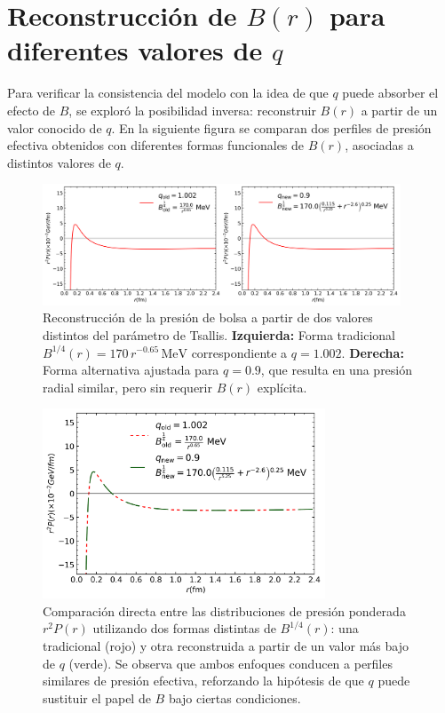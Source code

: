 \section{Reconstrucci\'on de \( B(r) \) para diferentes valores de \( q \)}

Para verificar la consistencia del modelo con la idea de que \( q \) puede absorber el efecto de \( B \), se explor\'o la posibilidad inversa: reconstruir \( B(r) \) a partir de un valor conocido de \( q \). En la siguiente figura se comparan dos perfiles de presi\'on efectiva obtenidos con diferentes formas funcionales de \( B(r) \), asociadas a distintos valores de \( q \).

\begin{figure}[H]
    \centering
    \includegraphics[width=0.95\textwidth]{./Images/Comparacion_B_old_new_dual.png}
    \caption[Reconstrucci\'on de \( B(r) \) para diferentes \( q \)]{Reconstrucci\'on de la presi\'on de bolsa a partir de dos valores distintos del par\'ametro de Tsallis. \textbf{Izquierda:} Forma tradicional \( B^{1/4}(r) = 170\,r^{-0.65} \,\mathrm{MeV} \) correspondiente a \( q = 1.002 \). \textbf{Derecha:} Forma alternativa ajustada para \( q = 0.9 \), que resulta en una presi\'on radial similar, pero sin requerir \( B(r) \) expl\'icita.}
    \label{fig:B_reconstructed_dual}
\end{figure}

\begin{figure}[H]
    \centering
    \includegraphics[width=0.75\textwidth]{./Images/Comparacion_B_old_new_combined.png}
    \caption[Comparaci\'on entre presiones con \( q = 1.002 \) y \( q = 0.9 \)]{Comparaci\'on directa entre las distribuciones de presi\'on ponderada \( r^2 P(r) \) utilizando dos formas distintas de \( B^{1/4}(r) \): una tradicional (rojo) y otra reconstruida a partir de un valor m\'as bajo de \( q \) (verde). Se observa que ambos enfoques conducen a perfiles similares de presi\'on efectiva, reforzando la hip\'otesis de que \( q \) puede sustituir el papel de \( B \) bajo ciertas condiciones.}
    \label{fig:B_reconstructed_combined}
\end{figure}

